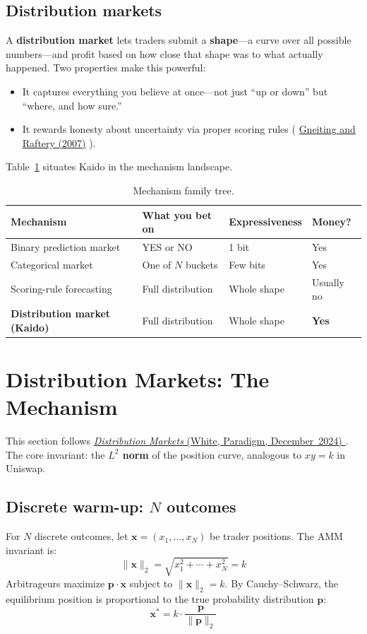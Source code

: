 \documentclass{portalciencia}
\newcommand{\paradigmdistribution}{%
  \href{https://www.paradigm.xyz/2024/12/distribution-markets}{%
    \emph{Distribution Markets} (White, Paradigm, December~2024)%
  }%
}
\newcommand{\linkgneiting}{%
  \href{https://doi.org/10.1198/016214506000001437}{Gneiting and Raftery (2007)}%
}
\begin{document}
\subsection{Distribution markets}

A \textbf{distribution market} lets traders submit a \textbf{shape}---a curve over all possible numbers---and profit based on how close that shape was to what actually happened. Two properties make this powerful:

\begin{itemize}
  \item It captures everything you believe at once---not just ``up or down'' but ``where, and how sure.''
  \item It rewards honesty about uncertainty via proper scoring rules (\linkgneiting).
\end{itemize}

Table~\ref{tab:family} situates Kaido in the mechanism landscape.

\begin{table}[ht]
\centering
\caption{Mechanism family tree.}
\label{tab:family}
\begin{tabular}{llll}
\toprule
Mechanism & What you bet on & Expressiveness & Money? \\
\midrule
Binary prediction market & YES or NO & 1 bit & Yes \\
Categorical market & One of $N$ buckets & Few bits & Yes \\
Scoring-rule forecasting & Full distribution & Whole shape & Usually no \\
\textbf{Distribution market (Kaido)} & Full distribution & Whole shape & \textbf{Yes} \\
\bottomrule
\end{tabular}
\end{table}

\section{Distribution Markets: The Mechanism}

This section follows \paradigmdistribution. The core invariant: the \textbf{$L^2$ norm} of the position curve, analogous to $xy=k$ in Uniswap.

\subsection{Discrete warm-up: $N$ outcomes}

For $N$ discrete outcomes, let $\mathbf{x} = (x_1, \ldots, x_N)$ be trader positions. The AMM invariant is:
\begin{equation}
\label{eq:sphere-invariant}
\|\mathbf{x}\|_2 = \sqrt{x_1^2 + \cdots + x_N^2} = k
\end{equation}
Arbitrageurs maximize $\mathbf{p} \cdot \mathbf{x}$ subject to $\|\mathbf{x}\|_2 = k$. By Cauchy--Schwarz, the equilibrium position is proportional to the true probability distribution $\mathbf{p}$:
\begin{equation}
\label{eq:equilibrium}
\mathbf{x}^* = k \cdot \frac{\mathbf{p}}{\|\mathbf{p}\|_2}
\end{equation}
\end{document}
